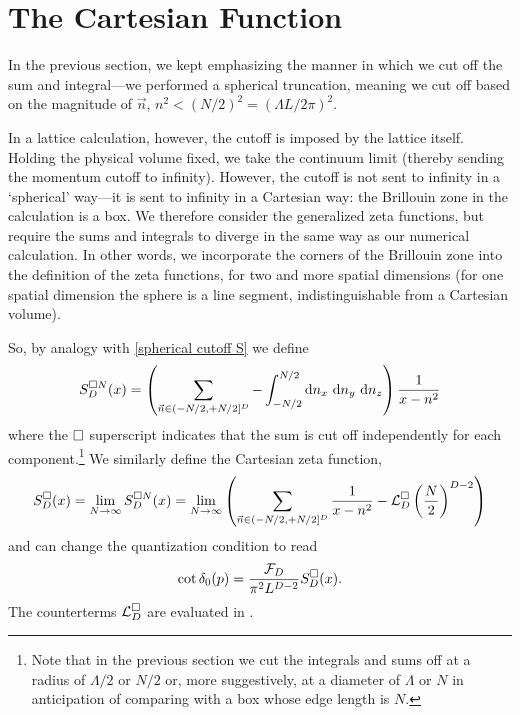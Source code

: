 \section{The Cartesian Function}\label{sec:cartesian}

In the previous section, we kept emphasizing the manner in which we cut off the sum and integral---we performed a spherical truncation, meaning we cut off based on the magnitude of $\vec{n}$, $n^2 < (N/2)^2 = (\Lambda L/2\pi)^2$.

In a lattice calculation, however, the cutoff is imposed by the lattice itself.
Holding the physical volume fixed, we take the continuum limit (thereby sending the momentum cutoff to infinity).
However, the cutoff is not sent to infinity in a `spherical' way---it is sent to infinity in a Cartesian way: the Brillouin zone in the calculation is a box.
We therefore consider the generalized zeta functions, but require the sums and integrals to diverge in the same way as our numerical calculation.
In other words, we incorporate the corners of the Brillouin zone into the definition of the zeta functions, for two and more spatial dimensions (for one spatial dimension the sphere is a line segment, indistinguishable from a Cartesian volume).

So, by analogy with \eqref{spherical cutoff S} we define
\begin{equation}
        S^{\cartesian N}_D(x)
        = \left(
            \sum_{\vec{n} \in (-N/2, +N/2]^D}
            -
            \int_{-N/2}^{N/2} \mathrm{d}n_x\ \mathrm{d}n_y\ \mathrm{d}n_z
        \right) \frac{1}{x-n^2}
\end{equation}
where the $\square$ superscript indicates that the sum is cut off independently for each component.\footnote{Note that in the previous section we cut the integrals and sums off at a radius of $\Lambda/2$ or $N/2$ or, more suggestively, at a diameter of $\Lambda$ or $N$ in anticipation of comparing with a box whose edge length is $N$.}
We similarly define the Cartesian zeta function,
\begin{equation}\label{eq:S cartesian}
    S^{\square}_D(x)
    =
    \lim_{N\rightarrow\infty} S^{\square N}_D(x)
    =
    \lim_{N\rightarrow\infty}\left( \sum_{\vec{n} \in (-N/2, +N/2]^D} \frac{1}{x-n^2} - \mathcal{L}_D^\square \left(\frac{N}{2}\right)^{D-2}\right)
\end{equation}
and can change the quantization condition to read
\begin{equation}\label{eq:cartesian quantization}
    \cot \delta_0(p) = \frac{\mathcal{F}_D}{\pi^2 L^{D-2}} S^\square_D(x).
\end{equation}
The counterterms $\mathcal{L}_D^\square$ are evaluated in .

